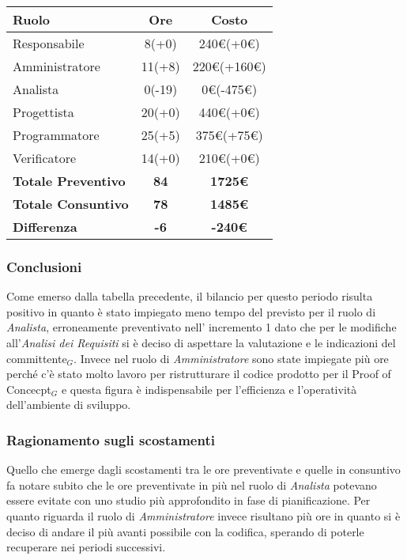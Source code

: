 {{{{{{{\quad
\def\tabularxcolumn#1{m{#1}}
{
	\begin{center}
		\renewcommand{\arraystretch}{1.4}
		\begin{tabularx}{10cm}{|X|c|c|}
			\hline
			\rowcolor{airforceblue}
			\textbf{Ruolo} & \textbf{Ore} & \textbf{Costo}\\
			\hline
			Responsabile & 8(+0) & 240\euro(+0\euro)\\
			\hline
			Amministratore & 11(+8) & 220\euro(+160\euro)\\
			\hline
			Analista & 0(-19) & 0\euro(-475\euro)\\
			\hline
			Progettista & 20(+0) & 440\euro(+0\euro)\\
			\hline
			Programmatore & 25(+5) & 375\euro(+75\euro)\\
			\hline
			Verificatore & 14(+0) & 210\euro(+0\euro)\\
			\hline
			\textbf{Totale Preventivo} & \textbf{84} & \textbf{1725\euro}\\
			\hline
			\textbf{Totale Consuntivo} & \textbf{78} & \textbf{1485\euro}\\
			\hline
			\textbf{Differenza} & \textbf{-6} & \textbf{-240\euro}
		\end{tabularx}
	\end{center}

\subsubsection{Conclusioni}\label{ConsuntivoPrimoPeriodoDiProgettazioneDiDettaglioCodificaConclusioni}
	Come emerso dalla tabella precedente, il bilancio per questo periodo risulta positivo in quanto è stato impiegato meno tempo del previsto per il ruolo di \textit{Analista}, erroneamente preventivato nell' incremento 1 dato che per le modifiche all'\textit{Analisi dei Requisiti} si è deciso di aspettare la valutazione e le indicazioni del committente$_G$.
	Invece nel ruolo di \textit{Amministratore} sono state impiegate più ore perché c'è stato molto lavoro per ristrutturare il codice prodotto per il Proof of Concecpt$_G$ e questa figura è indispensabile per l'efficienza e l'operatività dell'ambiente di sviluppo.

\subsubsection{Ragionamento sugli scostamenti}\label{ConsuntivoPrimoPeriodoDiProgettazioneDiDettaglioCodificaRagionamentoScostamenti}
	Quello che emerge dagli scostamenti tra le ore preventivate e quelle in consuntivo fa notare subito che le ore preventivate in più nel ruolo di \textit{Analista} potevano essere evitate con uno studio più approfondito in fase di pianificazione.
	Per quanto riguarda il ruolo di \textit{Amministratore} invece risultano più ore in quanto si è deciso di andare il più avanti possibile con la codifica, sperando di poterle recuperare nei periodi successivi.


}}}}}}}}
